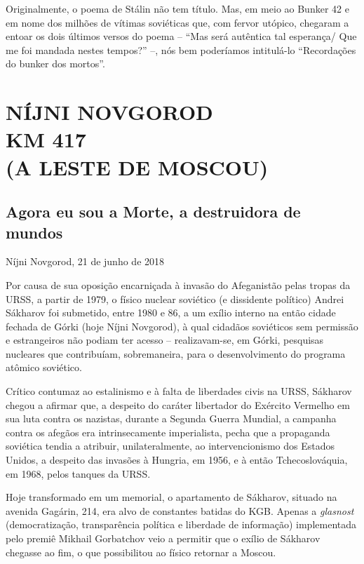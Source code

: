 Originalmente, o poema de Stálin não tem título. Mas, em meio ao Bunker
42 e em nome dos milhões de vítimas soviéticas que, com fervor utópico,
chegaram a entoar os dois últimos versos do poema -- ``Mas será
autêntica tal esperança/ Que me foi mandada nestes tempos?'' --, nós bem
poderíamos intitulá-lo ``Recordações do bunker dos mortos''.

\newpage
{}
\part*{NÍJNI NOVGOROD\\KM 417\\(A LESTE DE MOSCOU)}



\chapter*{Agora eu sou a Morte, a destruidora de mundos}

\begin{flushright}
Níjni Novgorod, 21 de junho de 2018
\end{flushright}

Por causa de sua oposição encarniçada à invasão do Afeganistão pelas
tropas da URSS, a partir de 1979, o físico nuclear soviético (e
dissidente político) Andrei Sákharov foi submetido, entre 1980 e 86, a
um exílio interno na então cidade fechada de Górki (hoje Níjni
Novgorod), à qual cidadãos soviéticos sem permissão e estrangeiros não
podiam ter acesso -- realizavam-se, em Górki, pesquisas nucleares que
contribuíam, sobremaneira, para o desenvolvimento do programa atômico
soviético.

Crítico contumaz ao estalinismo e à falta de liberdades civis na URSS,
Sákharov chegou a afirmar que, a despeito do caráter libertador do
Exército Vermelho em sua luta contra os nazistas, durante a Segunda
Guerra Mundial, a campanha contra os afegãos era intrinsecamente
imperialista, pecha que a propaganda soviética tendia a atribuir,
unilateralmente, ao intervencionismo dos Estados Unidos, a despeito das
invasões à Hungria, em 1956, e à então Tchecoslováquia, em 1968, pelos
tanques da URSS.

Hoje transformado em um memorial, o apartamento de Sákharov, situado na
avenida Gagárin, 214, era alvo de constantes batidas do KGB. Apenas a
\emph{glasnost} (democratização, transparência política e liberdade de
informação) implementada pelo premiê Mikhail Gorbatchov veio a permitir
que o exílio de Sákharov chegasse ao fim, o que possibilitou ao físico
retornar a Moscou.

